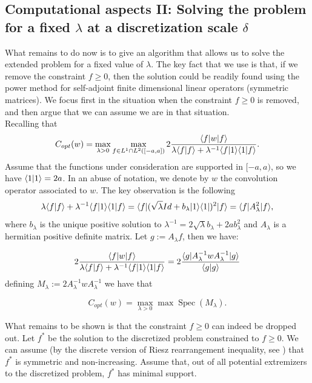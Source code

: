 \subsection{Computational aspects II: Solving the problem for a fixed \texorpdfstring{$\lambda$}{lambda} at a discretization scale \texorpdfstring{$\delta$}{delta} }

What remains to do now is to give an algorithm that allows us to solve the extended problem for a fixed value of $\lambda$. The key fact that we use is that, if we %
remove the constraint $f\ge 0$, then the solution could be readily found using the power method for self-adjoint finite dimensional linear operators (symmetric matrices). We focus first in the situation when the constraint $f\ge 0$ is removed, and then argue that we can assume we are in that situation. \\

Recalling that
$$
C_{opt}(w) = \max_{\lambda>0} \max_{f \in L^1 \cap L^2([-a,a])}  2 \frac{\langle f | w | f \rangle}{\lambda  \langle f | f \rangle + \lambda^ {-1}\langle f | 1 \rangle \langle 1 | f \rangle}. 
$$
Assume that the functions under consideration are supported in $[-a,a)$, so we have $\langle 1 | 1 \rangle = 2a$. In an abuse of notation, we denote by $w$ the convolution operator associated to $w$.
The key observation is the following
$$
{\lambda \langle f | f \rangle + \lambda^{-1} \langle f | 1 \rangle \langle 1 | f \rangle} = \langle f |  (\sqrt \lambda Id + b_{\lambda} | 1 \rangle \langle 1 | )^2 | f \rangle = \langle f | A_{\lambda}^2 | f \rangle,
$$
where $b_{\lambda}$ is the unique positive solution to $\lambda^{-1} = 2\sqrt{\lambda} b_{\lambda}+2a b_{\lambda}^2$ and $A_{\lambda}$ is a hermitian positive definite matrix. Let $g:= A_{\lambda}f$, then we have:

$$
2 \frac{\langle f | w | f \rangle}{\lambda  \langle f | f \rangle + \lambda^ {-1}\langle f | 1 \rangle \langle 1 | f \rangle}  = 2 \frac{\langle g | A_{\lambda}^{-1}  w A_{\lambda}^{-1}  | g \rangle}{\langle g | g \rangle}
$$
defining $M_{\lambda}:= 2 A_{\lambda}^{-1}  w A_{\lambda}^{-1} $ we have that

$$
C_{opt}(w) = \max_{\lambda>0} \max \operatorname{Spec}(M_{\lambda}).
$$



What remains to be shown is that the constraint $f\ge 0$ can indeed be dropped out. Let $f^*$ be the solution to the discretized problem constrained to $f\ge 0$. We can assume (by the discrete version of Riesz rearrangement inequality, see \cite[Chapter X]{HLP}) that $f^*$ is symmetric and non-increasing. Assume that, out of all potential extremizers to the discretized problem, $f^*$ has minimal support. \\

